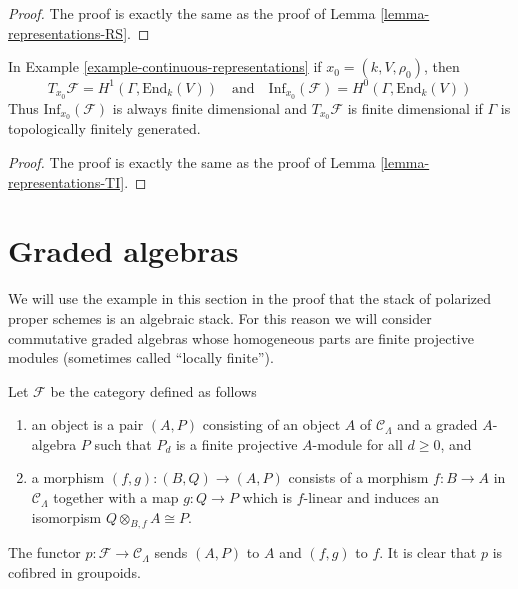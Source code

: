 \begin{proof}
The proof is exactly the same as the proof of
Lemma \ref{lemma-representations-RS}.
\end{proof}

\begin{lemma}
\label{lemma-continuous-representations-TI}
In Example \ref{example-continuous-representations}
if $x_0 = (k, V, \rho_0)$, then
$$
T_{x_0}\mathcal{F} = H^1(\Gamma, \text{End}_k(V))
\quad\text{and}\quad
\text{Inf}_{x_0}(\mathcal{F}) = H^0(\Gamma, \text{End}_k(V))
$$
Thus $\text{Inf}_{x_0}(\mathcal{F})$ is always finite dimensional
and $T_{x_0}\mathcal{F}$ is finite dimensional
if $\Gamma$ is topologically finitely generated.
\end{lemma}

\begin{proof}
The proof is exactly the same as the proof of
Lemma \ref{lemma-representations-TI}.
\end{proof}



\section{Graded algebras}
\label{section-graded-algebras}

\noindent
We will use the example in this section in the proof that the stack of
polarized proper schemes is an algebraic stack. For this reason we will
consider commutative graded algebras whose homogeneous parts are
finite projective modules (sometimes called ``locally finite'').

\begin{example}
\label{example-graded-algebras}
Let $\mathcal{F}$ be the category defined as follows
\begin{enumerate}
\item an object is a pair $(A, P)$ consisting of an
object $A$ of $\mathcal{C}_\Lambda$ and a graded $A$-algebra $P$
such that $P_d$ is a finite projective $A$-module for all $d \geq 0$, and
\item a morphism $(f, g) : (B, Q) \to (A, P)$ consists of
a morphism $f : B \to A$ in $\mathcal{C}_\Lambda$ together
with a map $g : Q \to P$ which is $f$-linear and induces an
isomorpism $Q \otimes_{B, f} A \cong P$.
\end{enumerate}
The functor $p : \mathcal{F} \to \mathcal{C}_\Lambda$ sends $(A, P)$
to $A$ and $(f, g)$ to $f$. It is clear that $p$ is cofibred in groupoids.
\end{example}

